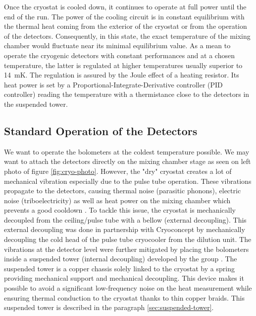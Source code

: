 Once the cryostat is cooled down, it continues to operate at full power until the end of the run. The power of the cooling circuit is in constant equilibrium with the thermal heat coming from the exterior of the cryostat or from the operation of the detectors. Consequently, in this state, the exact temperature of the mixing chamber would fluctuate near its minimal equilibrium value. 
As a mean to operate the cryogenic detectors with constant performances and at a chosen temperature, the latter is regulated at higher temperatures usually superior to \SI{14}{\milli\kelvin}. The regulation is assured by the Joule effect of a heating resistor. Its heat power is set by a Proportional-Integrate-Derivative controller (PID controller) reading the temperature with a  thermistance close to the detectors in the suspended tower.


\subsection{Standard Operation of the Detectors}

We want to operate the bolometers at the coldest temperature possible. We may want to attach the detectors directly on the mixing chamber stage as seen on left photo of figure \ref{fig:cryo-photo}. However, the "dry" cryostat creates a lot of mechanical vibration especially due to the pulse tube operation. These vibrations propagate to the detectors, causing thermal noise (parasitic phonons), electric noise (triboelectricity) as well as heat power on the mixing chamber which prevents a good cooldown \cite{Olivieri:2017lqz}.
To tackle this issue, the cryostat is mechanically decoupled from the ceiling/pulse tube with a bellow (external decoupling). This external decoupling was done in partnership with Cryoconcept by mechanically decoupling the cold head of the pulse tube cryocooler from the dilution unit. The vibrations at the detector level were further mitigated by placing the bolometers inside a suspended tower (internal decoupling) developed by the group \cite{Maisonobe:2018tbq}.
The suspended tower is a copper chassis solely linked to the cryostat by a spring providing mechanical support and mechanical decoupling. This device makes it possible to avoid a significant low-frequency noise on the heat measurement while ensuring thermal conduction to the cryostat thanks to thin copper braids. This suspended tower is described in the paragraph \ref{sec:suspended-tower}.

